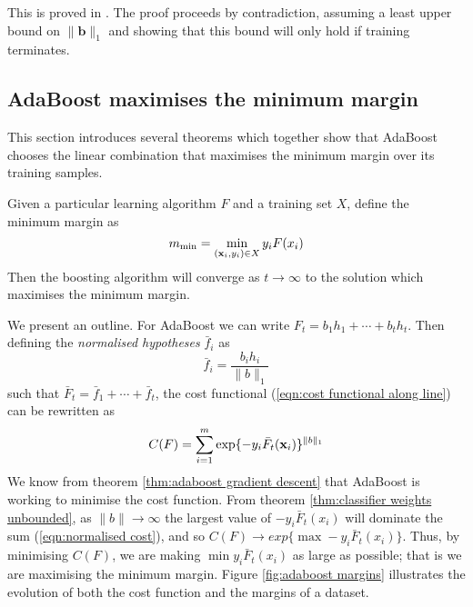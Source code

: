 \proof This is proved in \cite{Breiman97}.  The proof proceeds by
contradiction, assuming a least upper bound on $\|\mathbf{b}\|_1$ and
showing that this bound will only hold if training terminates.


\subsection{AdaBoost maximises the minimum margin}

This section introduces several theorems which together show that
AdaBoost chooses the linear combination that maximises the minimum
margin over its training samples.

\begin{theorem}
\label{thm:maximises minimum margin}
Given a particular learning algorithm $F$ and a training set $X$,
define the minimum margin as
\[
m_{\min} = \min_{(\mathbf{x}_i,y_i) \in X} y_i F(x_i)
\]
Then the boosting algorithm will converge as $t \rightarrow \infty$ to
the solution which maximises the minimum margin.
\end{theorem}

\proof We present an outline.  For AdaBoost we can write $F_t = b_1 h_1 +
\cdots + b_t h_t$. Then defining the \emph{normalised hypotheses}
$\bar{f}_i$ as 
%
\begin{equation}
\bar{f}_i = \frac{b_i h_i}{\|b\|_1}
\end{equation}
%
such that $\bar{F}_t = \bar{f}_1 + \cdots + \bar{f}_t$, the cost
functional (\ref{eqn:cost functional along line}) can be rewritten as
%
\begin{equation}
\label{eqn:normalised cost}
C(F) = \sum_{i=1}^{m} \exp\{-y_i \bar{F}_t(\mathbf{x}_i)\}^{\|b\|_1}
\end{equation}
%
We know from theorem \ref{thm:adaboost gradient descent} that
AdaBoost is working to minimise the cost function.  From theorem
\ref{thm:classifier weights unbounded}, as $\|b\| \rightarrow \infty$
the largest value of $-y_i \bar{F}_t(x_i)$ will dominate the sum
(\ref{eqn:normalised cost}), and so $C(F) \rightarrow exp\{\max -y_i
\bar{F}_t(x_i)\}$.  Thus, by 
minimising $C(F)$, we are making $\min y_i \bar{F}_t(x_i)$ as large as
possible; that is we are maximising the minimum margin.  Figure
\ref{fig:adaboost margins} illustrates the evolution of both the cost
function and the margins of a dataset.

